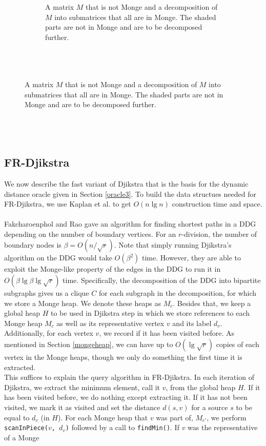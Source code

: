 \begin{figure}
\begin{subfigure}[b]{0.45\textwidth}
    \caption{A matrix $M$ that is not Monge and a decomposition of $M$ into submatrices
    that all are in Monge. The shaded parts are not in Monge and are to be decomposed
  further. \\ \\ \\ \\}
    \label{mongematrix}
  \end{subfigure}
\end{figure}

\subsection{FR-Djikstra}\label{frdjikstra}
We now describe the fast variant of Djikstra that is the basis for the dynamic distance oracle given in
Section \ref{oracle3}. To build the data structues needed for FR-Djikstra, we use Kaplan
et al. \cite{kaplan2012submatrix} to get $O(n\lg n)$ construction time and space. \\
\\
Fakcharoenphol and Rao \cite{fakcharoenphol2006planar} gave an algorithm for finding
shortest paths in a DDG depending on the number of boundary vertices. For an
$r$-division, the number of boundary nodes is $\beta=O(n/\sqrt{r})$. Note that simply
running Djikstra's algorithm on the DDG would take
$O(\beta^2)$ time. However, they are able to exploit the Monge-like property of the
edges in the DDG to run it in $O(\beta\lg \beta\lg \sqrt{r})$ time. Specifically, the
decomposition of the DDG into bipartite subgraphs gives us a
clique $C$ for each subgraph in the decomposition, for which we store a Monge heap. We
denote these heaps as $M_c$. Besides that, we keep a global heap $H$ to be used in
Djikstra step in which we store references to each Monge heap $M_c$ as well as its
representative vertex $v$ and its label $d_v$. Additionally, for each vertex $v$, we
record if it has been visited before. As mentioned in
Section \ref{mongeheap}, we can have up to $O(\lg \sqrt{r})$ copies of each vertex in the
Monge heaps, though we only do something the first time it is extracted. \\
This suffices to explain the query algorithm in FR-Djikstra. In each iteration of
Djikstra, we extract the minimum element, call it $v$, from the global heap $H$. If it has been visited
before, we do nothing except extracting it. If it has not been visited, we mark it as
visited and set the distance $d(s,v)$ for a source $s$ to be equal to $d_v$ (in $H$). For
each Monge heap that $v$ was part of, $M_{c'}$, we perform \texttt{scanInPiece($v$,
$d_v$)} followed by a call to \texttt{findMin()}. If $v$ was the representative of a Monge
